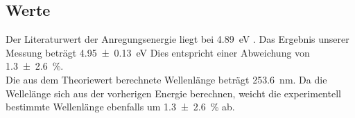 \subsection{Werte}

Der Literaturwert der Anregungsenergie liegt bei \qty{4.89}{\electronvolt} \cite{HG_Energie}. Das Ergebnis unserer Messung beträgt 
\qty{4.95\pm0.13}{\electronvolt} Dies entspricht einer Abweichung von \qty{1.3\pm2.6}{\percent}.\\
Die aus dem Theoriewert berechnete Wellenlänge beträgt \qty{253.6}{\nano\meter}. Da die Wellelänge sich aus der vorherigen Energie berechnen, 
weicht die experimentell bestimmte Wellenlänge ebenfalls um \qty{1.3\pm2.6}{\percent} ab.    


%
